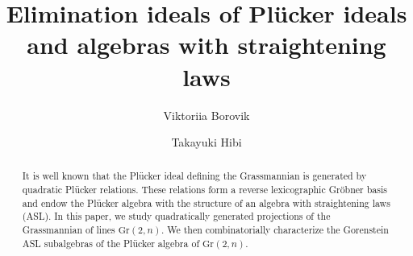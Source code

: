 \documentclass[12pt,a4paper]{amsart}
\theoremstyle{definition}
\begin{document}
\title[algebras with straightening laws]{ Elimination ideals of Pl\"ucker ideals and algebras with straightening laws}
\author[V.~Borovik]{Viktoriia Borovik}
\author[T.~Hibi]{Takayuki Hibi}
\address{(Viktoriia Borovik)
Max Planck Institute for Mathematics in the Sciences, Inselstrasse 22, 04103 Leipzig, Germany
}
\address{(Takayuki Hibi) Department of Pure and Applied Mathematics, Graduate School of Information Science and Technology, Osaka University, Suita, Osaka 565--0871, Japan}




\begin{abstract}
It is well known that the Plücker ideal defining the Grassmannian is  generated by quadratic Plücker relations. These relations form a reverse lexicographic Gröbner basis and endow the Plücker algebra with the structure of an algebra with straightening laws (ASL). In this paper, we study quadratically gene\-rated projections of the Grassmannian of lines $\mathrm{Gr}(2,n)$. %
We then combinatorially characterize the Gorenstein ASL subalgebras of the  Plücker algebra of $\mathrm{Gr}(2,n)$.
\end{abstract}

\maketitle
\thispagestyle{empty}
\end{document}
